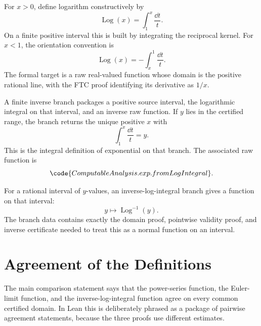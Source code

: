 \begin{definition}\label{def:log-integral}
For \(x>0\), define logarithm constructively by
\[
  \operatorname{Log}(x)=\int_1^x \frac{\dd t}{t}.
\]
On a finite positive interval this is built by integrating the reciprocal
kernel.  For \(x<1\), the orientation convention is
\[
  \operatorname{Log}(x)=-\int_x^1 \frac{\dd t}{t}.
\]
The formal target is a raw real-valued function whose domain is the positive
rational line, with the FTC proof identifying its derivative as \(1/x\).
\end{definition}

\begin{definition}
\label{def:exp-from-log-integral}
\leanok
A finite inverse branch packages a positive source interval, the logarithmic
integral on that interval, and an inverse raw function.  If \(y\) lies in the
certified range, the branch returns the unique positive \(x\) with
\[
  \int_1^x \frac{\dd t}{t}=y.
\]
This is the integral definition of exponential on that branch.  The
associated raw function is
\[
  \code{ComputableAnalysis.exp.fromLogIntegral}.
\]
\end{definition}

\begin{definition}
\label{def:exp-from-log-integral-interval}
\leanok
For a rational interval of \(y\)-values, an inverse-log-integral branch gives
a function on that interval:
\[
  y\longmapsto \operatorname{Log}^{-1}(y).
\]
The branch data contains exactly the domain proof, pointwise validity proof,
and inverse certificate needed to treat this as a normal function on an
interval.
\end{definition}

\section{Agreement of the Definitions}

\begin{definition}\label{def:exp-three-way-agreement}
\leanok
The main comparison statement says that the power-series function, the
Euler-limit function, and the inverse-log-integral function agree on every
common certified domain.
In Lean this is deliberately phrased as a package of pairwise agreement
statements, because the three proofs use different estimates.
\end{definition}

